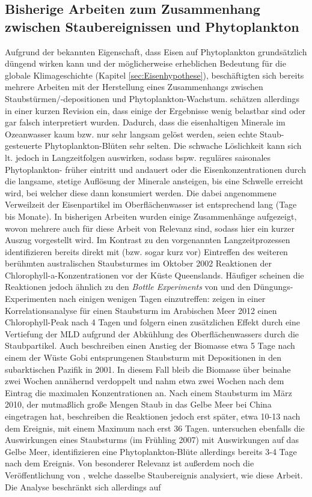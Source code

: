 \documentclass[12pt,a4paper,onecolumn,headheight=30pt]{scrartcl}
\begin{document}
\subsection{Bisherige Arbeiten zum Zusammenhang zwischen Staubereignissen und Phytoplankton}
Aufgrund der bekannten Eigenschaft, dass Eisen auf Phytoplankton grundsätzlich düngend wirken kann und der möglicherweise erheblichen Bedeutung für die globale Klimageschichte (Kapitel \ref{sec:Eisenhypothese}), beschäftigten sich bereits mehrere Arbeiten mit der Herstellung eines Zusammenhangs zwischen Staubstürmen/-depositionen und Phytoplankton-Wachstum. \citet{Boyd.2010} schätzen allerdings in einer kurzen Revision ein, dass einige der Ergebnisse wenig belastbar sind oder gar falsch interpretiert wurden. Dadurch, dass die eisenhaltigen Minerale im Ozeanwasser kaum bzw. nur sehr langsam gelöst werden, seien echte Staub-gesteuerte Phytoplankton-Blüten sehr selten. Die schwache Löslichkeit kann sich lt. \citet{Boyd.2010} jedoch in Langzeitfolgen auswirken, sodass bspw. reguläres saisonales Phytoplankton- früher eintritt und andauert oder die Eisenkonzentrationen durch die langsame, stetige Auflösung der Minerale ansteigen, bis eine Schwelle erreicht wird, bei welcher diese dann konsumiert werden. Die dabei angenommene Verweilzeit der Eisenpartikel im Oberflächenwasser ist entsprechend lang (Tage bis Monate). In bisherigen Arbeiten wurden einige Zusammenhänge aufgezeigt, wovon mehrere auch für diese Arbeit von Relevanz sind, sodass hier ein kurzer Auszug vorgestellt wird. Im Kontrast zu den vorgenannten Langzeitprozessen identifizieren \citet{Shaw.2008} bereits direkt mit (bzw. sogar kurz vor) Eintreffen des weiteren berühmten australischen Staubsturmes im Oktober 2002 Reaktionen der Chlorophyll-a-Konzentrationen vor der Küste Queenslands. Häufiger scheinen die Reaktionen jedoch ähnlich zu den \textit{Bottle Experiments} von \citet{Martin.1988} und den Düngungs-Experimenten \citep{Trull.2001} nach einigen wenigen Tagen einzutreffen: \citet{Bali.2019} zeigen in einer Korrelationsanalyse für einen Staubsturm im Arabischen Meer 2012 einen Chlorophyll-Peak nach 4 Tagen und folgern einen zusätzlichen Effekt durch eine Vertiefung der MLD aufgrund der Abkühlung des Oberflächenwassers durch die Staubpartikel. Auch \citet{Bishop.2002} beschreiben einen Anstieg der Biomasse etwa 5 Tage nach einem der Wüste Gobi entsprungenen Staubsturm mit Depositionen in den subarktischen Pazifik in 2001. In diesem Fall bleib die Biomasse über beinahe zwei Wochen annähernd verdoppelt und nahm etwa zwei Wochen nach dem Eintrag die maximalen Konzentrationen an. Nach einem Staubsturm im März 2010, der mutmaßlich große Mengen Staub in das Gelbe Meer bei China eingetragen hat, beschreiben \citet{Tan.2014} die Reaktionen jedoch erst später, etwa 10-13 nach dem Ereignis, mit einem Maximum nach erst 36 Tagen. \citet{Shi.2012} untersuchen ebenfalls die Auswirkungen eines Staubsturms (im Frühling 2007) mit Auswirkungen auf das Gelbe Meer, identifizieren eine Phytoplankton-Blüte allerdings bereits 3-4 Tage nach dem Ereignis. Von besonderer Relevanz ist außerdem noch die Veröffentlichung von \citet{Gabric.2016}, welche dasselbe Staubereignis analysiert, wie  diese Arbeit. Die Analyse beschränkt sich allerdings auf 
\end{document}
